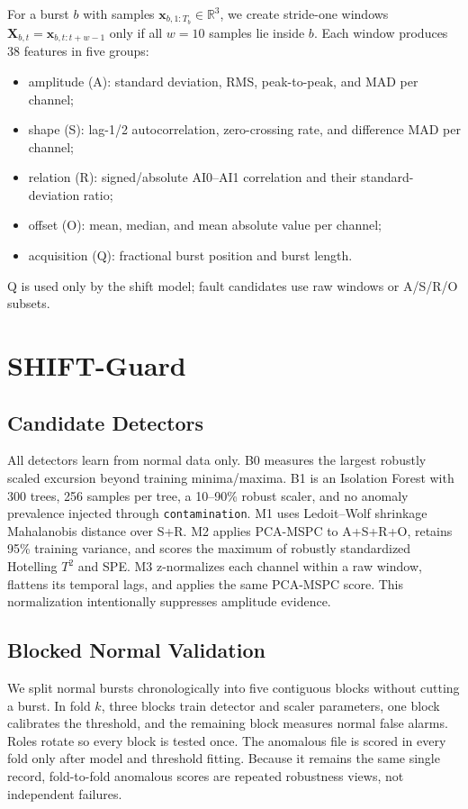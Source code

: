 \documentclass{article}
\begin{document}
For a burst $b$ with samples $\mathbf{x}_{b,1:T_b}\in\mathbb{R}^3$, we create stride-one windows $\mathbf{X}_{b,t}=\mathbf{x}_{b,t:t+w-1}$ only if all $w=10$ samples lie inside $b$. Each window produces 38 features in five groups:
\begin{itemize}
  \item amplitude (A): standard deviation, RMS, peak-to-peak, and MAD per channel;
  \item shape (S): lag-1/2 autocorrelation, zero-crossing rate, and difference MAD per channel;
  \item relation (R): signed/absolute AI0--AI1 correlation and their standard-deviation ratio;
  \item offset (O): mean, median, and mean absolute value per channel;
  \item acquisition (Q): fractional burst position and burst length.
\end{itemize}
Q is used only by the shift model; fault candidates use raw windows or A/S/R/O subsets.

\section{SHIFT-Guard}

\subsection{Candidate Detectors}

All detectors learn from normal data only. B0 measures the largest robustly scaled excursion beyond training minima/maxima. B1 is an Isolation Forest with 300 trees, 256 samples per tree, a 10--90\% robust scaler, and no anomaly prevalence injected through \texttt{contamination}. M1 uses Ledoit--Wolf shrinkage Mahalanobis distance over S+R. M2 applies PCA-MSPC to A+S+R+O, retains 95\% training variance, and scores the maximum of robustly standardized Hotelling $T^2$ and SPE. M3 z-normalizes each channel within a raw window, flattens its temporal lags, and applies the same PCA-MSPC score. This normalization intentionally suppresses amplitude evidence.

\subsection{Blocked Normal Validation}

We split normal bursts chronologically into five contiguous blocks without cutting a burst. In fold $k$, three blocks train detector and scaler parameters, one block calibrates the threshold, and the remaining block measures normal false alarms. Roles rotate so every block is tested once. The anomalous file is scored in every fold only after model and threshold fitting. Because it remains the same single record, fold-to-fold anomalous scores are repeated robustness views, not independent failures.
\end{document}
